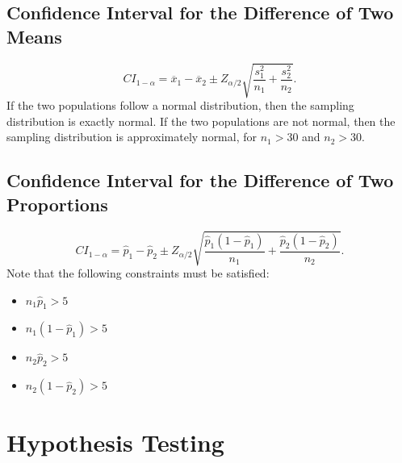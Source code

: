 \documentclass{article}
\begin{document}
\begin{multicols}{3}
\subsection{Confidence Interval for the Difference of Two Means}
\begin{equation*}
    {CI}_{1-\alpha} = \overline{x}_1 - \overline{x}_2 \pm Z_{\alpha/2} \sqrt{\frac{s_1^2}{n_1} + \frac{s_2^2}{n_2}}.
\end{equation*}
If the two populations follow a normal distribution, then the sampling distribution is exactly normal.
If the two populations are not normal, then the sampling distribution is approximately normal, for \(n_1 > 30\) and \(n_2 > 30\).
\subsection{Confidence Interval for the Difference of Two Proportions}
\begin{equation*}
    {CI}_{1-\alpha} = \hat{p}_1 - \hat{p}_2 \pm Z_{\alpha/2} \sqrt{\frac{\hat{p}_1\left( 1 - \hat{p}_1 \right)}{n_1} + \frac{\hat{p}_2\left( 1 - \hat{p}_2 \right)}{n_2}}.
\end{equation*}
Note that the following constraints must be satisfied:
\begin{itemize}
    \item \(n_1 \hat{p}_1 > 5\)
    \item \(n_1 \left( 1 - \hat{p}_1 \right) > 5\)
    \item \(n_2 \hat{p}_2 > 5\)
    \item \(n_2 \left( 1 - \hat{p}_2 \right) > 5\)
\end{itemize}
\section{Hypothesis Testing}

\end{multicols}
\end{document}

